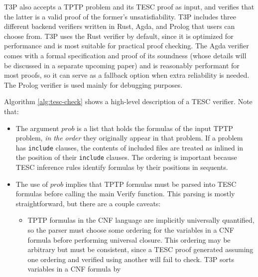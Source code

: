 \documentclass[12pt]{article}
\begin{document}
T3P also accepts a TPTP problem and its TESC proof as input, and verifies that the 
latter is a valid proof of the former's unsatisfiability. T3P includes three different
backend verifiers written in Rust, Agda, and Prolog that users can choose from.
T3P uses the Rust verifier by default, since it is optimized for performance and 
is most suitable for practical proof checking. The Agda verifier comes with a 
formal specification and proof of its soundness (whose details will be discussed in a 
separate upcoming paper) and is reasonably performant for most proofs,  
so it can serve as a fallback option when extra reliability is needed. 
The Prolog verifier is used mainly for debugging purposes.

Algorithm \ref{alg:tesc-check} shows a high-level description of a TESC verifier. 
Note that:
\begin{itemize}
  \item The argument $\mathit{prob}$ is a list that holds the formulas of the input TPTP problem, 
    \textit{in the order} they originally appear in that problem. If a problem has \texttt{include} 
    clauses, the contents of included files are treated as inlined in the position of their \texttt{include} 
    clauses. The ordering is important because TESC inference rules identify formulas by their 
    positions in sequents.
  \item The use of $\mathit{prob}$ implies that TPTP formulas must be parsed into TESC formulas 
    before calling the main $\mathrm{Verify}$ function. This parsing is mostly straightforward, but there 
    are a couple caveats: 
    \begin{itemize}
      \item TPTP formulas in the CNF language are implicitly universally quantified, so the parser must 
        choose some ordering for the variables in a CNF formula before performing universal closure. 
        This ordering may be arbitrary but must be consistent, since a TESC proof generated assuming 
        one ordering and verified using another will fail to check. T3P sorts variables in a CNF formula by 

\end{itemize}
\end{itemize}
\end{document}
